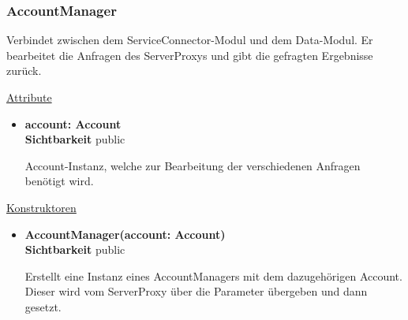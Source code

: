 \subsubsection{AccountManager} \label{service:klasse:AccountManager}
Verbindet zwischen dem ServiceConnector-Modul und dem Data-Modul. Er bearbeitet die Anfragen des ServerProxys und gibt die gefragten Ergebnisse zurück. \newline

\underline{Attribute}
\begin{itemize}
\itemsep0pt
\item \textbf{account: Account} \hfill\\ 
\textbf{Sichtbarkeit} public

Account-Instanz, welche zur Bearbeitung der verschiedenen Anfragen benötigt wird.
\end{itemize}

\underline{Konstruktoren}
\begin{itemize}
\itemsep0pt
\item \textbf{AccountManager(account: Account)} \hfill\\
\textbf{Sichtbarkeit} public

Erstellt eine Instanz eines AccountManagers mit dem dazugehörigen Account. Dieser wird vom ServerProxy über die Parameter übergeben und dann gesetzt.
\end{itemize}

